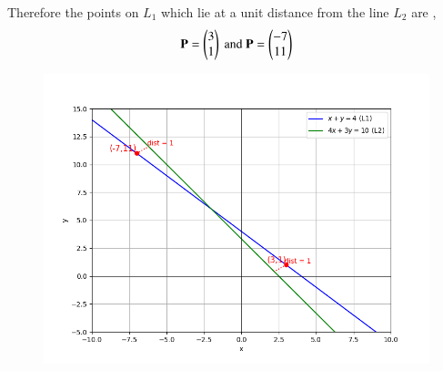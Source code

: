 \documentclass[journal]{IEEEtran}
\begin{document}
Therefore the points on $L_1$ which lie at a unit distance from the line $L_2$ are ,
\begin{align*}
    \mathbf{P}=\begin{pmatrix}3\\1\end{pmatrix} \ \text{and} \ \mathbf{P}=\begin{pmatrix}-7\\11\end{pmatrix}
\end{align*}
\begin{figure}[H]
\begin{center}
\includegraphics[width=0.6\columnwidth]{figs/fig.png}
\end{center}
\label{fig:Fig1}
\end{figure}
\end{document}
